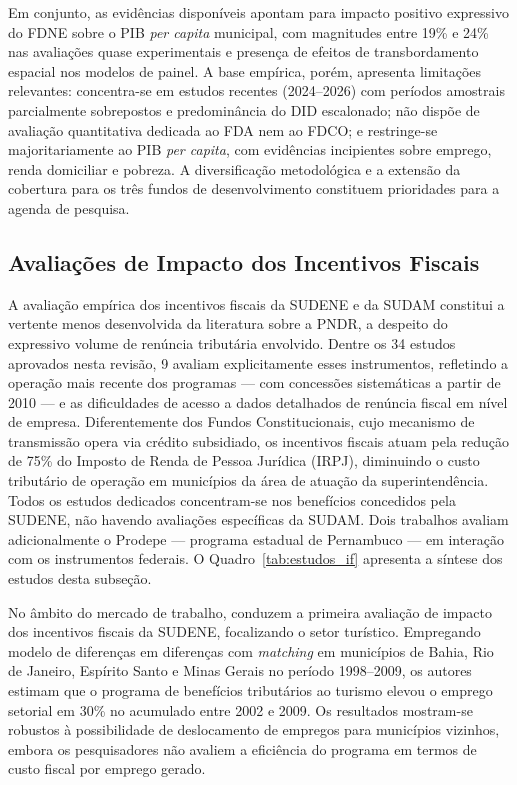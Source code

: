 Em conjunto, as evidências disponíveis apontam para impacto positivo expressivo do FDNE sobre o PIB \textit{per capita} municipal, com magnitudes entre 19\% e 24\% nas avaliações quase experimentais e presença de efeitos de transbordamento espacial nos modelos de painel. A base empírica, porém, apresenta limitações relevantes: concentra-se em estudos recentes (2024--2026) com períodos amostrais parcialmente sobrepostos e predominância do DID escalonado; não dispõe de avaliação quantitativa dedicada ao FDA nem ao FDCO; e restringe-se majoritariamente ao PIB \textit{per capita}, com evidências incipientes sobre emprego, renda domiciliar e pobreza. A diversificação metodológica e a extensão da cobertura para os três fundos de desenvolvimento constituem prioridades para a agenda de pesquisa.

\subsection{Avaliações de Impacto dos Incentivos Fiscais}
\label{subsec:if}

A avaliação empírica dos incentivos fiscais da SUDENE e da SUDAM constitui a vertente menos desenvolvida da literatura sobre a PNDR, a despeito do expressivo volume de renúncia tributária envolvido. Dentre os 34 estudos aprovados nesta revisão, 9 avaliam explicitamente esses instrumentos, refletindo a operação mais recente dos programas --- com concessões sistemáticas a partir de 2010 --- e as dificuldades de acesso a dados detalhados de renúncia fiscal em nível de empresa. Diferentemente dos Fundos Constitucionais, cujo mecanismo de transmissão opera via crédito subsidiado, os incentivos fiscais atuam pela redução de 75\% do Imposto de Renda de Pessoa Jurídica (IRPJ), diminuindo o custo tributário de operação em municípios da área de atuação da superintendência. Todos os estudos dedicados concentram-se nos benefícios concedidos pela SUDENE, não havendo avaliações específicas da SUDAM. Dois trabalhos avaliam adicionalmente o Prodepe --- programa estadual de Pernambuco --- em interação com os instrumentos federais. O Quadro~\ref{tab:estudos_if} apresenta a síntese dos estudos desta subseção.



No âmbito do mercado de trabalho,  conduzem a primeira avaliação de impacto dos incentivos fiscais da SUDENE, focalizando o setor turístico. Empregando modelo de diferenças em diferenças com \textit{matching} em municípios de Bahia, Rio de Janeiro, Espírito Santo e Minas Gerais no período 1998--2009, os autores estimam que o programa de benefícios tributários ao turismo elevou o emprego setorial em 30\% no acumulado entre 2002 e 2009. Os resultados mostram-se robustos à possibilidade de deslocamento de empregos para municípios vizinhos, embora os pesquisadores não avaliem a eficiência do programa em termos de custo fiscal por emprego gerado.

